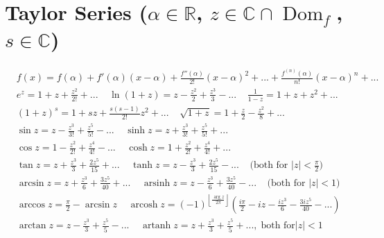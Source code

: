 \section*{Taylor Series \normalfont\scriptsize{($\alpha\in\mathbb{R}$, $z \in \mathbb{C}\cap \operatorname{Dom}_f$, $s \in \mathbb{C}$)}}
\begin{align*}
&f(x) = f(\alpha) + f'(\alpha)(x - \alpha) + \frac{f''(\alpha)}{2!}(x - \alpha)^2 + ... + \frac{f^{(n)}(\alpha)}{n!}(x - \alpha)^n +  ... \\
&e^z = 1 + z + \frac{z^2}{2!} +  ... \;\;\;\; \ln(1 + z) = z - \frac{z^2}{2} + \frac{z^3}{3} -  ... \;\;\;\; \frac{1}{1 - z} = 1 + z + z^2 +  ... \\
&(1 + z)^s = 1 + sz + \frac{s(s - 1)}{2!}z^2 +  ... \;\;\;\; \sqrt{1 + z} = 1 + \frac{z}{2} - \frac{z^2}{8} +  ... \\
&\sin z = z - \frac{z^3}{3!} + \frac{z^5}{5!}- ... \;\;\;\;\sinh  z = z + \frac{z^3}{3!} + \frac{z^5}{5!}  +  ... \\
& \cos z = 1 - \frac{z^2}{2!} +\frac{z^4}{4!}-  ... \;\;\;\; \cosh z = 1 + \frac{z^2}{2!} + \frac{z^4}{4!}  +  ... \\
& \tan z = z + \frac{z^3}{3} + \frac{2z^5}{15}+ ...\;\;\;\;\tanh z = z - \frac{z^3}{3} + \frac{2z^5}{15}  -   ...\;\; \; \; \text{(both for $|z|<\frac{\pi}{2}$)}\\
&\arcsin z = z+\frac{z^3}{6}+\frac{3z^5}{40}+...\; \; \; \;\operatorname{arsinh}z = z - \frac{z^3}{6} + \frac{3z^5}{40} -  ... \;\; \; \; \text{(both for $|z|<1$)}\\
&\arccos z = \frac{\pi}{2}-\arcsin z \; \; \; \; \operatorname{arcosh} z = (-1)^{\left\lfloor \tfrac{\arg z}{2\pi} \right\rfloor}\left(\frac{i\pi}{2}-iz-\frac{i z^3}{6}-\frac{3iz^5}{40}-...\right)\\
& \arctan z = z-\frac{z^3}{3}+\frac{z^5}{5}-...\; \; \; \; \operatorname{artanh}z = z + \frac{z^3}{3} + \frac{z^5}{5} +  ...,\;\text{both for$|z| < 1 $}
\end{align*}